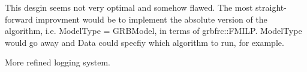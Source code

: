 
\begin{DoxyRefList}
\item[\label{todo__todo000001}%
\Hypertarget{todo__todo000001}%
Class \hyperlink{classderegnet_1_1DeregnetFinder}{deregnet\+:\+:Deregnet\+Finder$<$ Model\+Type, Data $>$} ]This desgin seems not very optimal and somehow flawed. The most straight-\/forward improvment would be to implement the absolute version of the algorithm, i.\+e. Model\+Type = G\+R\+B\+Model, in terms of grbfrc\+::\+F\+M\+I\+LP. Model\+Type would go away and Data could specfiy which algorithm to run, for example.

More refined logging system.
\end{DoxyRefList}